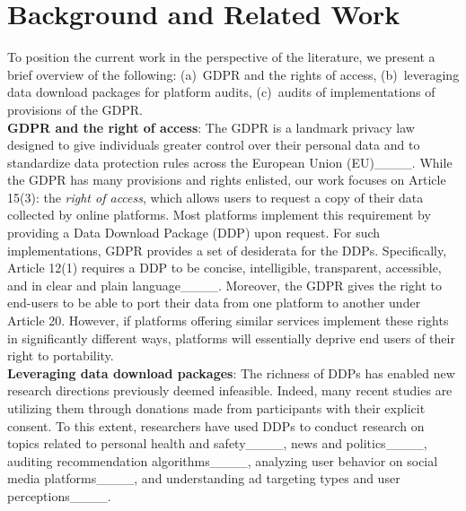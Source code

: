 \section{Background and Related Work}
\label{Sec: Related}

To position the current work in the perspective of the literature, we present a brief overview of the following: (a)~GDPR and the rights of access, (b)~leveraging data download packages for platform audits, (c)~audits of implementations of provisions of the GDPR.\\%
\noindent
\textbf{GDPR and the right of access}:
The GDPR is a landmark privacy law designed to give individuals greater control over their personal data and to standardize data protection rules across the European Union (EU)____.
While the GDPR has many provisions and rights enlisted, our work focuses on Article 15(3): the \textit{right of access}, which allows users to request a copy of their data collected by online platforms. Most platforms implement this requirement by providing a Data Download Package (DDP) upon request.
For such implementations, GDPR provides a set of desiderata for the DDPs.
Specifically, Article 12(1) requires a DDP to be concise, intelligible, transparent, accessible, and in clear and plain language____.
Moreover, the GDPR gives the right to end-users to be able to port their data from one platform to another under Article 20. 
However, if platforms offering similar services implement these rights in significantly different ways, platforms will essentially deprive end users of their right to portability.\\
\noindent
\textbf{Leveraging data download packages}:
The richness of DDPs has enabled new research directions previously deemed infeasible.
Indeed, many recent studies are utilizing them through donations made from participants with their explicit consent.
To this extent, researchers have used DDPs to conduct research on topics related to personal health and safety____, news and politics____, auditing recommendation algorithms____, analyzing user behavior on social media platforms____, and understanding ad targeting types and user perceptions____.\\
